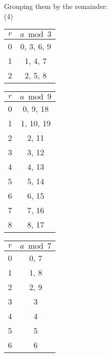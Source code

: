 \noindent
Grouping them by the remainder:\\
(4)
\begin{minipage}{0.32\textwidth}
    \centering
    \begin{tabular}{c|c}
        $r$ & $a \bmod 3$ \\
        \hline
        0   & 0, 3, 6, 9  \\
        1   & 1, 4, 7     \\
        2   & 2, 5, 8     \\
    \end{tabular}
\end{minipage}%
\begin{minipage}{0.32\textwidth}
    \centering
    \begin{tabular}{c|c}
        $r$ & $a \bmod 9$ \\
        \hline
        0   & 0, 9, 18    \\
        1   & 1, 10, 19   \\
        2   & 2, 11       \\
        3   & 3, 12       \\
        4   & 4, 13       \\
        5   & 5, 14       \\
        6   & 6, 15       \\
        7   & 7, 16       \\
        8   & 8, 17       \\
    \end{tabular}
\end{minipage}%
\begin{minipage}{0.32\textwidth}
    \centering
    \begin{tabular}{c|c}
        $r$ & $a \bmod 7$ \\
        \hline
        0   & 0, 7        \\
        1   & 1, 8        \\
        2   & 2, 9        \\
        3   & 3           \\
        4   & 4           \\
        5   & 5           \\
        6   & 6           \\
    \end{tabular}
\end{minipage}


